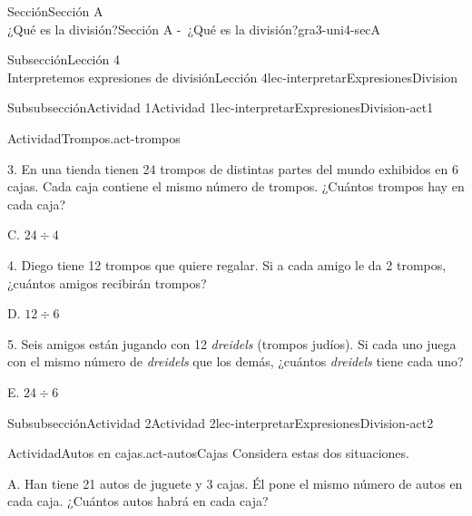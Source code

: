 \begin{sectionptx}{Sección}{{\Large Sección A\\}¿Qué es la división?}{}{Sección A -~¿Qué es la división?}{}{}{gra3-uni4-secA}
\begin{subsectionptx}{Subsección}{{\normalsize Lección 4\\[-0.05cm]}Interpretemos expresiones de división}{}{Lección 4}{}{}{lec-interpretarExpresionesDivision}
\begin{subsubsectionptx}{Subsubsección}{Actividad 1}{}{Actividad 1}{}{}{lec-interpretarExpresionesDivision-act1}
\begin{activity}{Actividad}{Trompos.}{act-trompos}
\begin{sidebyside}{2}{0.05}{0}{0.15}
\begin{sbspanel}{0.6}
3. En una tienda tienen 24 trompos de distintas partes del mundo exhibidos en 6 cajas. Cada caja contiene el mismo número de trompos. ¿Cuántos trompos hay en cada caja?%
\end{sbspanel}%
\begin{sbspanel}{0.2}%
\par
C. \(24 \div 4\)%
\end{sbspanel}%
\end{sidebyside}%
\begin{sidebyside}{2}{0.05}{0}{0.15}%
\begin{sbspanel}{0.6}%
4. Diego tiene 12 trompos que quiere regalar. Si a cada amigo le da 2 trompos, ¿cuántos amigos recibirán trompos?%
\end{sbspanel}%
\begin{sbspanel}{0.2}%
\par
D. \(12 \div 6\)%
\end{sbspanel}%
\end{sidebyside}%
\begin{sidebyside}{2}{0.05}{0}{0.15}%
\begin{sbspanel}{0.6}%
5. Seis amigos están jugando con 12 \emph{dreidels} (trompos judíos). Si cada uno juega con el mismo número de \emph{dreidels} que los demás, ¿cuántos \emph{dreidels} tiene cada uno?%
\end{sbspanel}%
\begin{sbspanel}{0.2}%
\par
E. \(24 \div 6\)%
\end{sbspanel}%
\end{sidebyside}%
\end{activity}%
\end{subsubsectionptx}
%
%
\typeout{************************************************}
\typeout{************************************************}
%
\begin{subsubsectionptx}{Subsubsección}{Actividad 2}{}{Actividad 2}{}{}{lec-interpretarExpresionesDivision-act2}
\begin{activity}{Actividad}{Autos en cajas.}{act-autosCajas}%
Considera estas dos situaciones.%
\begin{sidebyside}{2}{0.05}{0.05}{0.1}%
\begin{sbspanel}{0.4}%
A. Han tiene 21 autos de juguete y 3 cajas. Él pone el mismo número de autos en cada caja. ¿Cuántos autos habrá en cada caja?%
\end{sbspanel}%
\begin{sbspanel}{0.4}%
\par

\end{sbspanel}
\end{sidebyside}
\end{activity}
\end{subsubsectionptx}
\end{subsectionptx}
\end{sectionptx}
